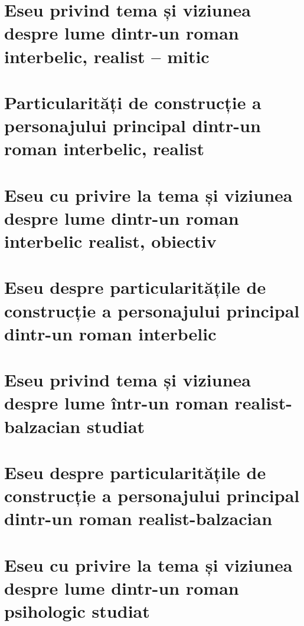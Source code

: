 \documentclass[
 12pt,                       %
 a4paper                     %
]{book}
\begin{document}
\chapter{Eseu privind tema și viziunea despre lume dintr-un roman interbelic, realist -- mitic}


\chapter{Particularități de construcție a personajului principal din\-tr-un roman interbelic, realist}



\chapter{Eseu cu privire la tema și viziunea despre lume dintr-un roman interbelic realist, obiectiv}


\chapter{Eseu despre particularitățile de construcție a personajului principal dintr-un roman interbelic}



\chapter{Eseu privind tema și viziunea despre lume într-un roman realist-balzacian studiat}


\chapter{Eseu despre particularitățile de construcție a personajului principal dintr-un roman realist-balzacian}



\chapter{Eseu cu privire la tema și viziunea despre lume dintr-un roman psihologic studiat}

\end{document}
